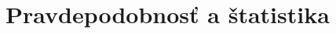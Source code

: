 \chapter[Pravdepodobnosť a štatistika]{Pravdepodobnosť a štatistika}
\label{pravdepodobnost_a_statistika} %


